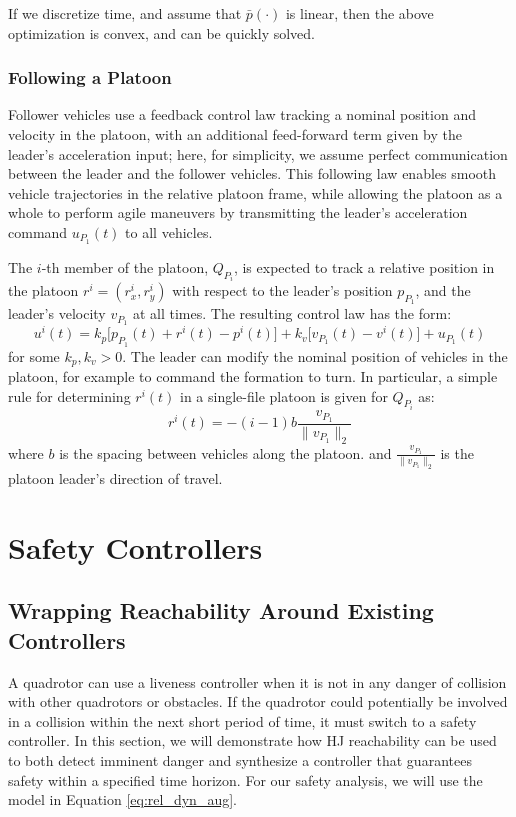 If we discretize time, and assume that $\bar{p}(\cdot)$ is linear, then the above optimization is convex, and can be quickly solved.

\subsubsection{Following a Platoon} \label{sec:follow_platoon}
Follower vehicles use a feedback control law tracking a nominal position and velocity in the platoon, with an additional feed-forward term given by the leader's acceleration input; here, for simplicity, we assume perfect communication between the leader and the follower vehicles. This following law enables smooth vehicle trajectories in the relative platoon frame, while allowing the platoon as a whole to perform agile maneuvers by transmitting the leader's acceleration command $u_{P_1}(t)$ to all vehicles.

The $i$-th member of the platoon, $Q_{P_i}$, is expected to track a relative position in the platoon $r^i = (r_x^i,r_y^i)$ with respect to the leader's position $p_{P_1}$, and the leader's velocity $v_{P_1}$ at all times. The resulting control law has the form:
\begin{equation}\label{eq:follow}
u^i(t) = k_p \big[p_{P_1}(t) + r^i(t) - p^i(t) \big] + k_v\big[v_{P_1}(t) - v^i(t)\big] + u_{P_1}(t)
\end{equation}
for some $k_p,k_v>0$. The leader can modify the nominal position of vehicles in the platoon, for example to command the formation to turn. In particular, a simple rule for determining $r^i(t)$ in a single-file platoon is given for $Q_{P_i}$ as:
\begin{equation}\label{eq:nominal_pos}
r^i(t) = - (i-1) b \frac{v_{P_1}}{\|v_{P_1}\|_2}
\end{equation}
where $b$ is the spacing between vehicles along the platoon. and $\frac{v_{P_1}}{\|v_{P_1}\|_2}$ is the platoon leader's direction of travel.

\section{Safety Controllers \label{sec:safety}}
\subsection{Wrapping Reachability Around Existing Controllers}
A quadrotor can use a liveness controller when it is not in any danger of collision with other quadrotors or obstacles. If the quadrotor could potentially be involved in a collision within the next short period of time, it must switch to a safety controller. In this section, we will demonstrate how HJ reachability can be used to both detect imminent danger and synthesize a controller that guarantees safety within a specified time horizon. For our safety analysis, we will use the model in Equation \eqref{eq:rel_dyn_aug}.

